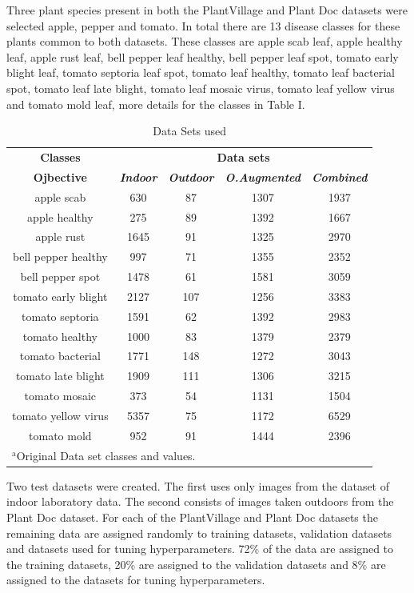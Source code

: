 \documentclass[conference]{IEEEtran}
\begin{document}
Three plant species present in both the PlantVillage and Plant Doc datasets were selected apple, pepper and tomato. In total there are 13 disease classes for these plants common to both datasets. These classes are apple scab leaf, apple healthy leaf, apple rust leaf, bell pepper leaf healthy, bell pepper leaf spot, tomato early blight leaf, tomato septoria leaf spot, tomato leaf healthy, tomato leaf bacterial spot, tomato leaf late blight, tomato leaf mosaic virus, tomato leaf yellow virus and tomato mold leaf, more details for the classes in Table I. 
\begin{table}[htbp]
\caption{Data Sets used}
\begin{center}
\begin{tabular}{|c|c|c|c|c|}
\hline
\textbf{Classes}&\multicolumn{4}{|c|}{\textbf{Data sets}} \\
\cline{2-5} 
\textbf{Ojbective} & \textbf{\textit{Indoor}}& \textbf{\textit{Outdoor}}& \textbf{\textit{O.Augmented}} & \textbf{\textit{Combined}} \\
\hline
apple scab &630&87&1307&1937 \\
\hline
apple healthy &275&89&1392&1667\\
\hline
apple rust &1645&91&1325&2970\\
\hline
bell pepper healthy &997&71&1355&2352\\
\hline
bell pepper spot &1478&61&1581&3059\\
\hline
tomato early blight &2127&107&1256&3383\\
\hline
tomato septoria  &1591&62&1392&2983\\
\hline
tomato healthy &1000&83&1379&2379\\
\hline
tomato bacterial &1771&148&1272&3043\\
\hline
tomato late blight &1909&111&1306&3215\\
\hline
tomato mosaic  &373&54&1131&1504\\
\hline
tomato yellow virus &5357&75&1172&6529\\
\hline
tomato mold &952&91&1444&2396\\
\hline
\multicolumn{5}{l}{$^{\mathrm{a}}$Original Data set classes and values.}
\end{tabular}
\label{tab1}
\end{center}
\end{table}

Two test datasets were created. The first uses only images from the dataset of indoor laboratory data. The second consists of images taken outdoors from the Plant Doc dataset. For each of the PlantVillage and Plant Doc datasets the remaining data are assigned randomly to training datasets, validation datasets and datasets used for tuning hyperparameters. 72\% of the data are assigned to the training datasets, 20\% are assigned to the validation datasets and 8\% are assigned to the datasets for tuning hyperparameters. \
\end{document}
